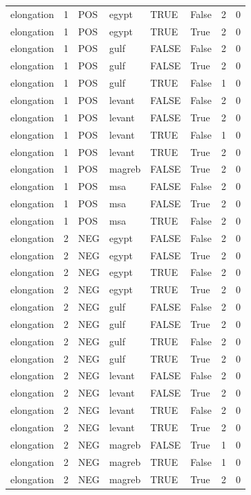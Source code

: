 \begin{tabular}{llllllrr}
elongation & 1 & POS & egypt & TRUE & False & 2 & 0 \\
elongation & 1 & POS & egypt & TRUE & True & 2 & 0 \\
elongation & 1 & POS & gulf & FALSE & False & 2 & 0 \\
elongation & 1 & POS & gulf & FALSE & True & 2 & 0 \\
elongation & 1 & POS & gulf & TRUE & False & 1 & 0 \\
elongation & 1 & POS & levant & FALSE & False & 2 & 0 \\
elongation & 1 & POS & levant & FALSE & True & 2 & 0 \\
elongation & 1 & POS & levant & TRUE & False & 1 & 0 \\
elongation & 1 & POS & levant & TRUE & True & 2 & 0 \\
elongation & 1 & POS & magreb & FALSE & True & 2 & 0 \\
elongation & 1 & POS & msa & FALSE & False & 2 & 0 \\
elongation & 1 & POS & msa & FALSE & True & 2 & 0 \\
elongation & 1 & POS & msa & TRUE & False & 2 & 0 \\
elongation & 2 & NEG & egypt & FALSE & False & 2 & 0 \\
elongation & 2 & NEG & egypt & FALSE & True & 2 & 0 \\
elongation & 2 & NEG & egypt & TRUE & False & 2 & 0 \\
elongation & 2 & NEG & egypt & TRUE & True & 2 & 0 \\
elongation & 2 & NEG & gulf & FALSE & False & 2 & 0 \\
elongation & 2 & NEG & gulf & FALSE & True & 2 & 0 \\
elongation & 2 & NEG & gulf & TRUE & False & 2 & 0 \\
elongation & 2 & NEG & gulf & TRUE & True & 2 & 0 \\
elongation & 2 & NEG & levant & FALSE & False & 2 & 0 \\
elongation & 2 & NEG & levant & FALSE & True & 2 & 0 \\
elongation & 2 & NEG & levant & TRUE & False & 2 & 0 \\
elongation & 2 & NEG & levant & TRUE & True & 2 & 0 \\
elongation & 2 & NEG & magreb & FALSE & True & 1 & 0 \\
elongation & 2 & NEG & magreb & TRUE & False & 1 & 0 \\
elongation & 2 & NEG & magreb & TRUE & True & 2 & 0 \\

\end{tabular}

